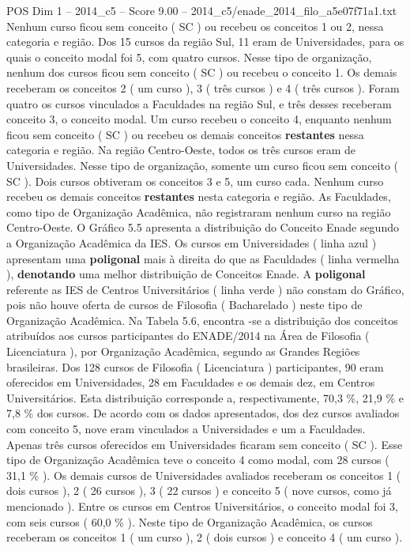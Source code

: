 \begin{textsample}{POS Dim 1 – 2014\_c5 – Score 9.00 – 2014\_c5/enade\_2014\_filo\_a5e07f71a1.txt}
Nenhum curso ficou sem conceito ( SC ) ou recebeu os conceitos 1 ou 2, nessa categoria e região.
Dos 15 cursos da região Sul, 11 eram de Universidades, para os quais o conceito modal foi 5, com quatro cursos.
Nesse tipo de organização, nenhum dos cursos ficou sem conceito ( SC ) ou recebeu o conceito 1.
Os demais receberam os conceitos 2 ( um curso ), 3 ( três cursos ) e 4 ( três cursos ).
Foram quatro os cursos vinculados a Faculdades na região Sul, e três desses receberam conceito 3, o conceito modal.
Um curso recebeu o conceito 4, enquanto nenhum ficou sem conceito ( SC ) ou recebeu os demais conceitos \textbf{restantes} nessa categoria e região.
Na região Centro-Oeste, todos os três cursos eram de Universidades.
Nesse tipo de organização, somente um curso ficou sem conceito ( SC ).
Dois cursos obtiveram os conceitos 3 e 5, um curso cada.
Nenhum curso recebeu os demais conceitos \textbf{restantes} nesta categoria e região.
As Faculdades, como tipo de Organização Acadêmica, não registraram nenhum curso na região Centro-Oeste.
O Gráfico 5.5 apresenta a distribuição do Conceito Enade segundo a Organização Acadêmica da IES.
Os cursos em Universidades ( linha azul ) apresentam uma \textbf{poligonal} mais à direita do que as Faculdades ( linha vermelha ), \textbf{denotando} uma melhor distribuição de Conceitos Enade.
A \textbf{poligonal} referente as IES de Centros Universitários ( linha verde ) não constam do Gráfico, pois não houve oferta de cursos de Filosofia ( Bacharelado ) neste tipo de Organização Acadêmica.
Na Tabela 5.6, encontra -se a distribuição dos conceitos atribuídos aos cursos participantes do ENADE/2014 na Área de Filosofia ( Licenciatura ), por Organização Acadêmica, segundo as Grandes Regiões brasileiras.
Dos 128 cursos de Filosofia ( Licenciatura ) participantes, 90 eram oferecidos em Universidades, 28 em Faculdades e os demais dez, em Centros Universitários.
Esta distribuição corresponde a, respectivamente, 70,3 \%, 21,9 \% e 7,8 \% dos cursos.
De acordo com os dados apresentados, dos dez cursos avaliados com conceito 5, nove eram vinculados a Universidades e um a Faculdades.
Apenas três cursos oferecidos em Universidades ficaram sem conceito ( SC ).
Esse tipo de Organização Acadêmica teve o conceito 4 como modal, com 28 cursos ( 31,1 \% ).
Os demais cursos de Universidades avaliados receberam os conceitos 1 ( dois cursos ), 2 ( 26 cursos ), 3 ( 22 cursos ) e conceito 5 ( nove cursos, como já mencionado ).
Entre os cursos em Centros Universitários, o conceito modal foi 3, com seis cursos ( 60,0 \% ).
Neste tipo de Organização Acadêmica, os cursos receberam os conceitos 1 ( um curso ), 2 ( dois cursos ) e conceito 4 ( um curso ).

\end{textsample}

